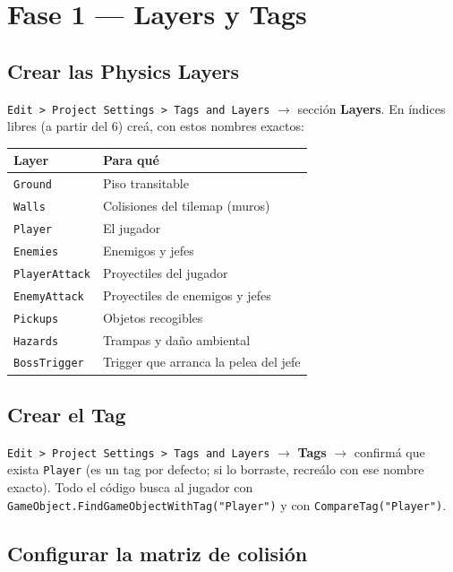 \documentclass[a4paper,12pt]{article}
\newcommand{\code}[1]{\texttt{#1}}
\begin{document}
\section{Fase 1 --- Layers y Tags}

\subsection{Crear las Physics Layers}

\code{Edit > Project Settings > Tags and Layers} $\to$ sección \textbf{Layers}. En índices libres
(a partir del 6) creá, con estos nombres exactos:

\begin{center}
\begin{tabular}{|l|p{8cm}|}
\hline
\textbf{Layer} & \textbf{Para qué} \\
\hline
\code{Ground} & Piso transitable \\
\hline
\code{Walls} & Colisiones del tilemap (muros) \\
\hline
\code{Player} & El jugador \\
\hline
\code{Enemies} & Enemigos y jefes \\
\hline
\code{PlayerAttack} & Proyectiles del jugador \\
\hline
\code{EnemyAttack} & Proyectiles de enemigos y jefes \\
\hline
\code{Pickups} & Objetos recogibles \\
\hline
\code{Hazards} & Trampas y daño ambiental \\
\hline
\code{BossTrigger} & Trigger que arranca la pelea del jefe \\
\hline
\end{tabular}
\end{center}

\subsection{Crear el Tag}

\code{Edit > Project Settings > Tags and Layers} $\to$ \textbf{Tags} $\to$ confirmá que exista
\code{Player} (es un tag por defecto; si lo borraste, recreálo con ese nombre exacto). Todo el
código busca al jugador con \code{GameObject.FindGameObjectWithTag("Player")} y con
\code{CompareTag("Player")}.

\subsection{Configurar la matriz de colisión}
\end{document}
